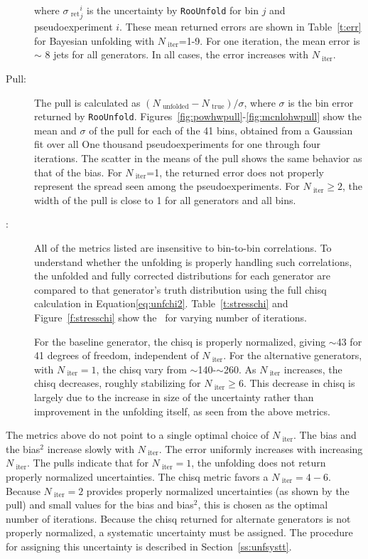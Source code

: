 \begin{description}
where ${\sigma_{\textrm{ ret}}}^{i}_{j}$ is the uncertainty by \texttt{RooUnfold} for bin $j$ and pseudoexperiment $i$. These mean \textrm{ ret}urned errors are shown in Table~\ref{t:err} for Bayesian unfolding with $N_{\textrm{ iter}}$=1-9. For one iteration, the mean error is $\sim$ 8 jets for all generators. In all cases, the error increases with $N_{\textrm{ iter}}$.
\item[Pull:] The pull is calculated as $(N_{\textrm{ unfolded}}-N_{\textrm{ true}})/\sigma$, where $\sigma$ is the bin error \textrm{ ret}urned by \texttt{RooUnfold}.
Figures~\ref{fig:powhwpull}-\ref{fig:mcnlohwpull} show the mean and $\sigma$ of the pull for each of the 41 bins, obtained from a Gaussian fit over all One thousand pseudoexperiments for one through four iterations. The scatter in the means of the pull shows the same behavior as that of the bias. For $N_{\textrm{ iter}}$=1, the \textrm{ ret}urned error does not properly represent the spread seen among the pseudoexperiments. For $N_{\textrm{ iter}} \geq 2$, the width of the pull is close to 1 for all generators and all bins.  
\item[\chisq:] All of the metrics listed are insensitive to bin-to-bin correlations. To understand whether the unfolding is properly handling such correlations, the unfolded and fully corrected distributions for each generator are compared to that generator's truth distribution using the full chisq calculation in Equation\ref{eq:unfchi2}. Table~\ref{t:stresschi} and Figure~\ref{f:stresschi} show the \chisq\ for varying number of iterations.

For the baseline generator, the chisq is properly normalized, giving $\sim$43 for 41 degrees of freedom, independent of $N_{\textrm{ iter}}$. For the alternative generators, with $N_{\textrm{ iter}}=1$, the chisq vary from $\sim$140-$\sim$260. As $N_{\textrm{ iter}}$ increases, the chisq decreases, roughly stabilizing for $N_{\textrm{ iter}} \geq 6$. This decrease in chisq is largely due to the increase in size of the uncertainty rather than improvement in the unfolding itself, as seen from the above metrics. 
\end{description}
The metrics above do not point to a single optimal choice of $N_{\textrm{ iter}}$. The bias and the bias$^{2}$ increase slowly with $N_{\textrm{ iter}}$. The error uniformly increases with increasing $N_{\textrm{ iter}}$. The pulls indicate that for $N_{\textrm{ iter}}=1$, the unfolding does not \textrm{ ret}urn properly normalized uncertainties. The chisq metric favors a $N_{\textrm{ iter}}=4-6$. Because $N_{\textrm{ iter}}=2$ provides properly normalized uncertainties (as shown by the pull) and small values for the bias and bias$^2$, this is chosen as the optimal number of iterations. Because the chisq \textrm{ ret}urned for alternate generators is not properly normalized, a systematic uncertainty must be assigned. The procedure for assigning this uncertainty is described in Section~\ref{ss:unfsystt}. 


